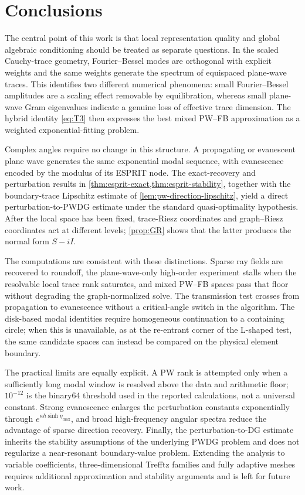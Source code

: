 \documentclass[11pt]{article}
\newcommand{\ii}{i}
\numberwithin{equation}{section}
\begin{document}
\section{Conclusions}\label{sec:conclusion}
The central point of this work is that local representation quality and global algebraic conditioning should be treated as separate questions.  In the scaled Cauchy-trace geometry, Fourier--Bessel modes are orthogonal with explicit weights and the same weights generate the spectrum of equispaced plane-wave traces.  This identifies two different numerical phenomena: small Fourier--Bessel amplitudes are a scaling effect removable by equilibration, whereas small plane-wave Gram eigenvalues indicate a genuine loss of effective trace dimension.  The hybrid identity \eqref{eq:T3} then expresses the best mixed PW--FB approximation as a weighted exponential-fitting problem.

Complex angles require no change in this structure.  A propagating or evanescent plane wave generates the same exponential modal sequence, with evanescence encoded by the modulus of its ESPRIT node.  The exact-recovery and perturbation results in \cref{thm:esprit-exact,thm:esprit-stability}, together with the boundary-trace Lipschitz estimate of \cref{lem:pw-direction-lipschitz}, yield a direct perturbation-to-PWDG estimate under the standard quasi-optimality hypothesis.  After the local space has been fixed, trace-Riesz coordinates and graph--Riesz coordinates act at different levels; \cref{prop:GR} shows that the latter produces the normal form $S-\ii I$.

The computations are consistent with these distinctions.  Sparse ray fields are recovered to roundoff, the plane-wave-only high-order experiment stalls when the resolvable local trace rank saturates, and mixed PW--FB spaces pass that floor without degrading the graph-normalized solve.  The transmission test crosses from propagation to evanescence without a critical-angle switch in the algorithm.  The disk-based modal identities require homogeneous continuation to a containing circle; when this is unavailable, as at the re-entrant corner of the L-shaped test, the same candidate spaces can instead be compared on the physical element boundary.

The practical limits are equally explicit.  A PW rank is attempted only when a sufficiently long modal window is resolved above the data and arithmetic floor; $10^{-12}$ is the binary64 threshold used in the reported calculations, not a universal constant.  Strong evanescence enlarges the perturbation constants exponentially through $e^{\kappa h\sinh\eta_{\max}}$, and broad high-frequency angular spectra reduce the advantage of sparse direction recovery.  Finally, the perturbation-to-DG estimate inherits the stability assumptions of the underlying PWDG problem and does not regularize a near-resonant boundary-value problem.  Extending the analysis to variable coefficients, three-dimensional Trefftz families and fully adaptive meshes requires additional approximation and stability arguments and is left for future work.
\end{document}
